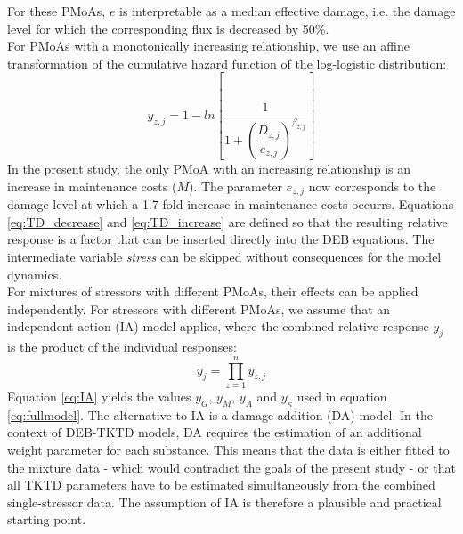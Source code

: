 \documentclass[preprint,12pt]{elsarticle}
\begin{document}
For these PMoAs, $e$ is interpretable as a median effective damage, i.e. the damage level  
for which the corresponding flux is decreased by 50\%. \\
For PMoAs with a monotonically increasing relationship, we use an affine transformation of the cumulative hazard 
function of the log-logistic distribution:
%
\begin{equation}
    y_{z,j} = 1 - ln \left[ \frac{1}{ 1 + \left( \dfrac{D_{z,j}} {e_{z,j}} \right) ^ {\beta_{z,j}} } \right]
    \label{eq:TD_increase}
\end{equation}
%
In the present study, the only PMoA with an increasing relationship is an increase in maintenance costs ($M$).
The parameter $e_{z,j}$ now corresponds to the damage level at which a 1.7-fold increase in maintenance costs occurrs.  
Equations \ref{eq:TD_decrease} and \ref{eq:TD_increase} are defined so that the resulting relative response is a factor 
that can be inserted directly into the DEB equations. 
The intermediate variable \textit{stress} \citep{jagerRevisitingSimplifiedDEBtox2020}
can be skipped without consequences for the model dynamics. \\
%
For mixtures of stressors with different PMoAs, their effects can be applied independently. 
For stressors with different PMoAs, we assume that an independent action (IA) model applies, 
where the combined relative response $y_j$ is the product of the individual responses: 
%
\begin{equation}
    y_{j} = \prod\limits_{z=1}^{n} y_{z,j}
    \label{eq:IA}
\end{equation}
%
Equation \ref{eq:IA} yields the values $y_G$, $y_M$, $y_A$ and $y_{\kappa}$ used in equation \ref{eq:fullmodel}.
The alternative to IA is a damage addition (DA) model. In the context of DEB-TKTD models, DA requires the estimation 
of an additional weight parameter for each substance. This means that the data is either fitted to the mixture data - 
which would contradict the goals of the present study - or that all TKTD parameters have to be estimated simultaneously 
from the combined single-stressor data. The assumption of IA is therefore a plausible and practical starting point.
%
\end{document}
